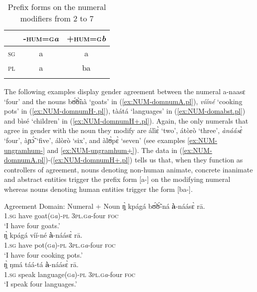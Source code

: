 \begin{exe}
\begin{exe}
\begin{exe}
{\begin{exe}
\begin{exe}
\begin{exe}
\begin{exe}
\begin{exe}
\begin{exe}
\begin{exe}
\begin{exe}
\begin{exe}
\begin{table}[h]
\caption{Prefix forms on the numeral modifiers  from 2 
to 7\label{tab:distagree}}
\centering
 \begin{tabular}{lcc}
\lsptoprule
&\textsc{-hum}=\textsc{g}\textit{a}&\textsc{+hum}=\textsc{g}\textit{b}\\
\midrule
\textsc{sg}&a&a\\
\textsc{pl}&a&ba\\
\lspbottomrule
 \end{tabular} 


\end{table} 

The following examples display gender agreement between the numeral {\sls 
a-naasɛ}
`four' and the nouns {\sls bʊ̃́ʊ̃̀nà}  `goats' in (\ref{ex:NUM-domnumA.pl}), 
{\it
vííné} `cooking pots' in (\ref{ex:NUM-domnumH-.pl}), {\sls tàátá} 
`languages' in (\ref{ex:NUM-domabst.pl}) and {\sls bìsé} `children'  in
(\ref{ex:NUM-domnumH+.pl}). Again, the only numerals that agree in gender with
the noun they modify are {\sls álìɛ̀} `two', {\sls átòrò}  `three', {\it
ànáásɛ̀} `four', {\sls àɲɔ̃́} `five', {\sls álòrò}  `six',  and   {\sls 
àlʊ̀pɛ̀}
 `seven' (see examples \ref{ex:NUM-ungramhum-} and \ref{ex:NUM-ungramhum+}).
 The data in (\ref{ex:NUM-domnumA.pl})-(\ref{ex:NUM-domnumH+.pl}) tells us
that, when they function as controllers of agreement, nouns denoting non-human
animate, concrete inanimate and abstract entities  trigger the prefix form 
[{\sls a-}] on the modifying numeral whereas nouns denoting human entities 
trigger the
form [{\sls ba-}]. 


  \ea\label{ex:NUM-domnum}{\rm Agreement Domain: Numeral + Noun}
\ea\label{ex:NUM-domnumA.pl}
\gll   ŋ̩̀  kpágá   bʊ̃́ʊ̃́-ná {\bf à}-náásɛ̀ rā.\\
    \textsc{1.sg}  {have}  {goat(\textsc{g}\textit{a})-\textsc{pl}} 
{\textsc{3pl.g}\textit{a}-four}  \textsc{foc}  \\
\glt `I have four goats.'\\


\ex\label{ex:NUM-domnumH-.pl}
\gll     ŋ̩̀  kpágá víí-né {\bf à}-náásɛ̀ rā.\\
  \textsc{1.sg}  {have}  {pot(\textsc{g}\textit{a})-\textsc{pl}}  
{\textsc{3pl.g}\textit{a}-four}   \textsc{foc}  \\
\glt `I have four cooking pots.'\\


\ex\label{ex:NUM-domabst.pl}
\gll  ŋ̩̀ ŋmá  táá-tá {\bf à}-náásɛ̀ rā.\\
  \textsc{1.sg}  {speak}  {language(\textsc{g}\textit{a})-\textsc{pl}}  
{\textsc{3pl.g}\textit{a}-four}   \textsc{foc}  \\
\glt `I speak four languages.'\\



\end{exe}
\end{exe}
\end{exe}
\end{exe}
\end{exe}
\end{exe}
\end{exe}
\end{exe}
\end{exe}}
\end{exe}
\end{exe}
\end{exe}
